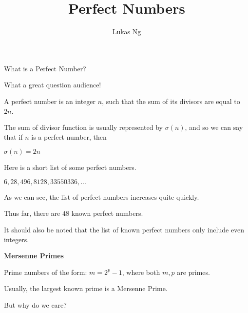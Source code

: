 \documentclass{beamer}
\title{Perfect Numbers}
\author{Lukas Ng}\institute{University of Washington}
\begin{document}
\begin{frame}
\titlepage

\end{frame}

\begin{frame}
What is a Perfect Number?

\bigskip

What a great question audience!

\end{frame}

\begin{frame}

A perfect number is an integer $n$, such that the sum of its divisors are equal to $2n$.

The sum of divisor function is usually represented by $\sigma(n)$, and so we can say that if $n$ is a perfect number, then 

\begin{center}

$\sigma(n) = 2n$

\end{center}

\end{frame}

\begin{frame}

Here is a short list of some perfect numbers.

$6, 28, 496, 8128, 33550336, ...$

As we can see, the list of perfect numbers increases quite quickly. 

Thus far, there are $48$ known perfect numbers.

It should also be noted that the list of known perfect numbers only include even integers.

\end{frame}

\begin{frame}

\textbf{Mersenne Primes}

\bigskip

Prime numbers of the form: $m = 2^p - 1$, where both $m, p$ are primes.

Usually, the largest known prime is a Mersenne Prime.

\bigskip

But why do we care?

\end{frame}
\end{document}
